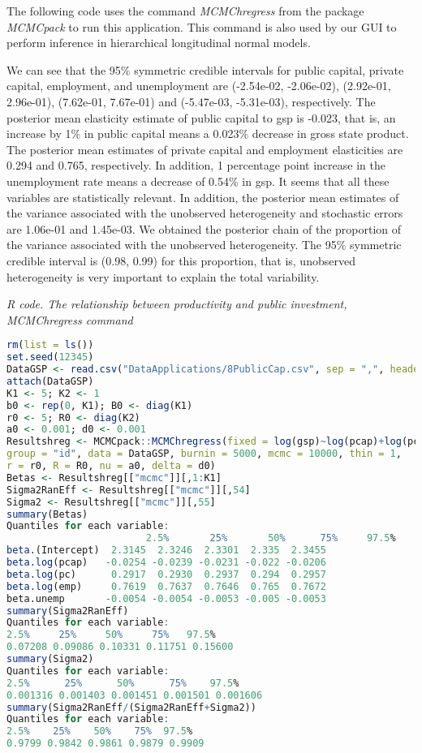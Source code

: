 The following code uses the command \textit{MCMChregress} from the package \textit{MCMCpack} to run this application. This command is also used by our GUI to perform inference in hierarchical longitudinal normal models.

We can see that the 95\% symmetric credible intervals for public capital, private capital, employment, and unemployment are (-2.54e-02, -2.06e-02), (2.92e-01, 2.96e-01), (7.62e-01, 7.67e-01) and (-5.47e-03, -5.31e-03), respectively. The posterior mean elasticity estimate of public capital to gsp is -0.023, that is, an increase by 1\% in public capital means a 0.023\% decrease in gross state product. The posterior mean estimates of private capital and employment elasticities are 0.294 and 0.765, respectively. In addition, 1 percentage point increase in the unemployment rate means a decrease of 0.54\% in gsp. It seems that all these variables are statistically relevant. In addition, the posterior mean estimates of the variance associated with the unobserved heterogeneity and stochastic errors are 1.06e-01 and 1.45e-03. We obtained the posterior chain of the proportion of the variance associated with the unobserved heterogeneity. The 95\% symmetric credible interval is (0.98, 0.99) for this proportion, that is, unobserved heterogeneity is very important to explain the total variability.

\begin{tcolorbox}[enhanced,width=4.67in,center upper,
	fontupper=\large\bfseries,drop shadow southwest,sharp corners]
	\textit{R code. The relationship between productivity and public investment, MCMChregress command}
	\begin{VF}
		\begin{lstlisting}[language=R]
rm(list = ls())
set.seed(12345)
DataGSP <- read.csv("DataApplications/8PublicCap.csv", sep = ",", header = TRUE, fileEncoding = "latin1")
attach(DataGSP)
K1 <- 5; K2 <- 1
b0 <- rep(0, K1); B0 <- diag(K1)
r0 <- 5; R0 <- diag(K2)
a0 <- 0.001; d0 <- 0.001
Resultshreg <- MCMCpack::MCMChregress(fixed = log(gsp)~log(pcap)+log(pc)+log(emp)+unemp, random = ~1, 
group = "id", data = DataGSP, burnin = 5000, mcmc = 10000, thin = 1,
r = r0, R = R0, nu = a0, delta = d0)
Betas <- Resultshreg[["mcmc"]][,1:K1]
Sigma2RanEff <- Resultshreg[["mcmc"]][,54]
Sigma2 <- Resultshreg[["mcmc"]][,55]
summary(Betas)
Quantiles for each variable:
						2.5%       25%       50%      75%     97.5%
beta.(Intercept)  2.3145  2.3246  2.3301  2.335  2.3455
beta.log(pcap)   -0.0254 -0.0239 -0.0231 -0.022 -0.0206
beta.log(pc)      0.2917  0.2930  0.2937  0.294  0.2957
beta.log(emp)     0.7619  0.7637  0.7646  0.765  0.7672
beta.unemp       -0.0054 -0.0054 -0.0053 -0.005 -0.0053
summary(Sigma2RanEff)
Quantiles for each variable:
2.5%     25%     50%     75%   97.5% 
0.07208 0.09086 0.10331 0.11751 0.15600 
summary(Sigma2)
Quantiles for each variable:
2.5%      25%      50%      75%    97.5% 
0.001316 0.001403 0.001451 0.001501 0.001606 
summary(Sigma2RanEff/(Sigma2RanEff+Sigma2))
Quantiles for each variable:
2.5%    25%    50%    75%  97.5% 
0.9799 0.9842 0.9861 0.9879 0.9909
\end{lstlisting}
	\end{VF}
\end{tcolorbox}

